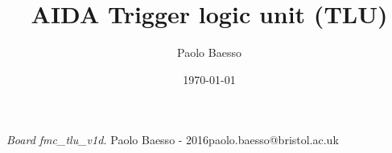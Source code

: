 \documentclass[10pt,twoside, fleqn]{memoir}
\author{Paolo Baesso}
\title{AIDA Trigger logic unit (TLU)}
\date{\today}
\makeatletter
\def\maketitle{%
  \null
  \thispagestyle{empty}%
  \vfill
  \begin{center}\leavevmode
    \normalfont
    {\LARGE\raggedleft \@author\par}%
    \hrulefill\par
    {\huge\raggedright \@title\par}%
    \vskip 1cm
  {\Large \@date\par}%
  \end{center}%
  \vfill
  \null
  \cleardoublepage
  }
\makeatother
\begin{document}
\let\cleardoublepage\clearpage


\maketitle
\frontmatter

\null\vfill
\begin{flushleft}
\textit{Board fmc\_tlu\_v1d.}\newline
\newline
Paolo Baesso - 2016\newline paolo.baesso@bristol.ac.uk
\bigskip

\end{flushleft}
\let\cleardoublepage\clearpage

\newpage
\tableofcontents

\mainmatter
\sloppy

\newenvironment{SpecialPar}
  {\begin{shaded}\noindent}
  {\end{shaded}}



\def\brd{FMC\_TLU\_v1E }
\def\oldbrd{FMC\_TLU\_v1C }
%
















%


\printglossaries
\printglossary[type=\acronymtype,title=Abbreviations]

%
%
\end{document}
